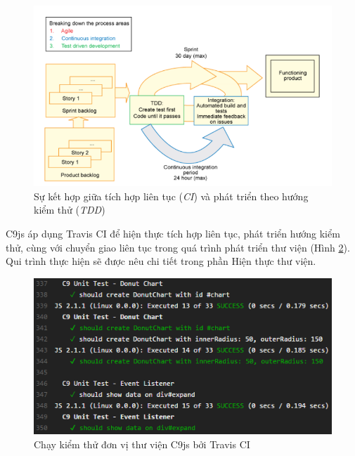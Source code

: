 \documentclass[12pt,a4paper,twoside]{article}
\newcommand*\NewPage{\newpage\null\thispagestyle{empty}\newpage}
\begin{document}
\begin{figure}[!h]
	\begin{center}
    \includegraphics[scale=0.9]{image/ci_cd}
    \caption{Sự kết hợp giữa tích hợp liên tục (\textit{CI}) và phát triển theo hướng kiểm thử (\textit{TDD})}
    \label{fig:ci_cd}
	\end{center}
\end{figure}

C9js áp dụng Travis CI để hiện thực tích hợp liên tục, phát triển hướng kiểm thử, cùng với chuyển giao liên tục trong quá trình phát triển thư viện (Hình \ref{fig:ci_c9}). Qui trình thực hiện sẽ được nêu chi tiết trong phần Hiện thực thư viện.

\begin{figure}[!h]
	\begin{center}
    \includegraphics[scale=1]{image/ci_c9}
    \caption{Chạy kiểm thử đơn vị thư viện C9js bởi Travis CI}
    \label{fig:ci_c9}
	\end{center}
\end{figure}
\clearpage
\NewPage
\end{document}
